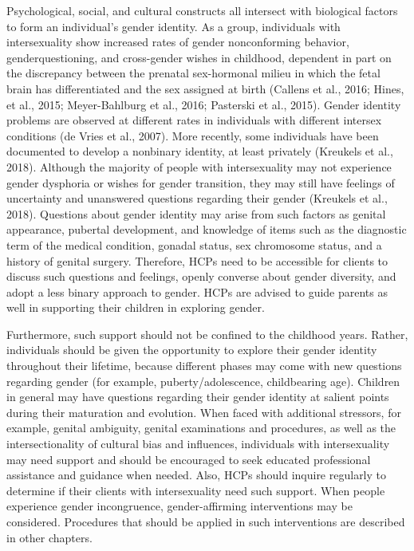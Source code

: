 \documentclass[
]{book}
\begin{document}
Psychological, social, and cultural constructs
all intersect with biological factors to form an
individual's gender identity. As a group, individuals with intersexuality show increased rates of
gender nonconforming behavior, genderquestioning, and cross-gender wishes in childhood, dependent in part on the discrepancy
between the prenatal sex-hormonal milieu in
which the fetal brain has differentiated and the
sex assigned at birth (Callens et al., 2016; Hines,
et al., 2015; Meyer-Bahlburg et al., 2016; Pasterski
et al., 2015). Gender identity problems are
observed at different rates in individuals with
different intersex conditions (de Vries et al.,
2007). More recently, some individuals have been
documented to develop a nonbinary identity, at
least privately (Kreukels et al., 2018). Although
the majority of people with intersexuality may
not experience gender dysphoria or wishes for
gender transition, they may still have feelings of
uncertainty and unanswered questions regarding
their gender (Kreukels et al., 2018). Questions
about gender identity may arise from such factors
as genital appearance, pubertal development, and
knowledge of items such as the diagnostic term
of the medical condition, gonadal status, sex
chromosome status, and a history of genital surgery. Therefore, HCPs need to be accessible for
clients to discuss such questions and feelings,
openly converse about gender diversity, and adopt
a less binary approach to gender. HCPs are
advised to guide parents as well in supporting
their children in exploring gender.

Furthermore, such support should not be confined to the childhood years. Rather, individuals
should be given the opportunity to explore their
gender identity throughout their lifetime, because
different phases may come with new questions
regarding gender (for example, puberty/adolescence, childbearing age). Children in general may
have questions regarding their gender identity at
salient points during their maturation and evolution. When faced with additional stressors, for
example, genital ambiguity, genital examinations
and procedures, as well as the intersectionality
of cultural bias and influences, individuals with
intersexuality may need support and should be
encouraged to seek educated professional assistance and guidance when needed. Also, HCPs
should inquire regularly to determine if their
clients with intersexuality need such support.
When people experience gender incongruence,
gender-affirming interventions may be considered. Procedures that should be applied in such
interventions are described in other chapters.
\end{document}
